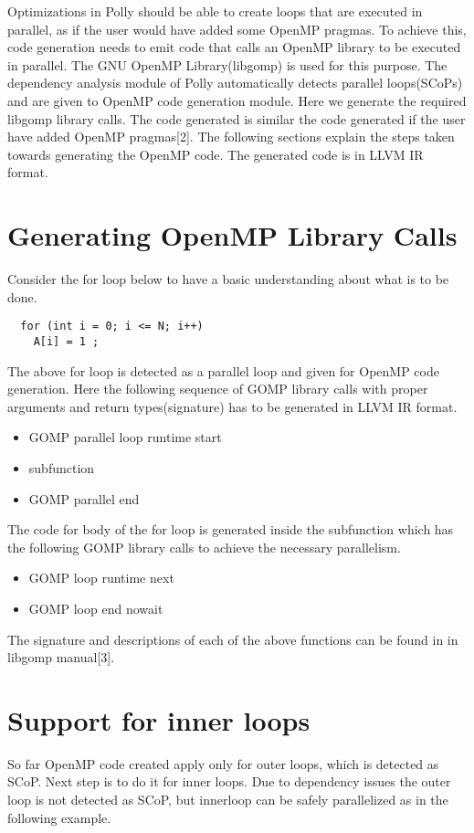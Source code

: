 \label{chap:openmp}

Optimizations in Polly should be able to create loops that are executed in parallel, as if the user would have
added some OpenMP pragmas. To achieve this, code generation needs to emit code that calls an OpenMP
library to be executed in parallel. The GNU OpenMP Library(libgomp) is used for this purpose. The
dependency analysis module of Polly automatically detects parallel loops(SCoPs) and are given to OpenMP
code generation module. Here we generate the required libgomp library calls. The code generated is similar
the code generated if the user have added OpenMP pragmas[2]. The following sections explain the steps
taken towards generating the OpenMP code. The generated code is in LLVM IR format.
\section{Generating OpenMP Library Calls}
Consider the for loop below to have a basic understanding about what is to be done.

{\footnotesize
\begin{lstlisting}
  for (int i = 0; i <= N; i++)
    A[i] = 1 ;
\end{lstlisting}
}

The above for loop is detected as a parallel loop and given for OpenMP code generation. Here the following
sequence of GOMP library calls with proper arguments and return types(signature) has to be generated in
LLVM IR format.

\begin{itemize}
\item GOMP parallel loop runtime start
\item subfunction
\item GOMP parallel end
\end{itemize}

The code for body of the for loop is generated inside the subfunction which has the following GOMP library
calls to achieve the necessary parallelism.

\begin{itemize}
\item GOMP loop runtime next
\item GOMP loop end nowait
\end{itemize}

The signature and descriptions of each of the above functions can be found in in libgomp manual[3].

\section{Support for inner loops}
So far OpenMP code created apply only for outer loops, which is detected as SCoP. Next step is to do it for
inner loops. Due to dependency issues the outer loop is not detected as SCoP, but innerloop can be safely
parallelized as in the following example.

